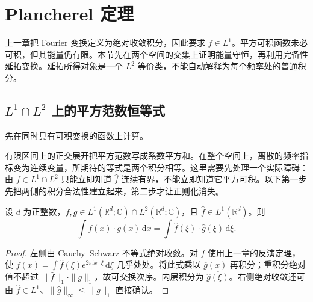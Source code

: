 \section{Plancherel 定理}
\label{b2:sec:0401}

上一章把 Fourier 变换定义为绝对收敛积分，因此要求 \(f\in L^1\)。平方可积函数未必可积，但其能量仍有限。本节先在两个空间的交集上证明能量守恒，再利用完备性延拓变换。延拓所得对象是一个 \(L^2\) 等价类，不能自动解释为每个频率处的普通积分。

\subsection{\texorpdfstring{\(L^1\cap L^2\)}{L¹∩L²} 上的平方范数恒等式}
\label{b2:subsec:040101}

先在同时具有可积变换的函数上计算。

\ProseParagraphBreak

有限区间上的正交展开把平方范数写成系数平方和。在整个空间上，离散的频率指标变为连续变量，所期待的等式是两个积分相等。这里需要先处理一个实际障碍：由 \(f\in L^1\cap L^2\) 只能立即知道 \(\widehat f\) 连续有界，不能立即知道它平方可积。以下第一步先把两侧的积分合法性建立起来，第二步才让正则化消失。

\begin{lemma}\label{b2:lem:04-parseval-core}
设 \(d\) 为正整数，\(f,g\in L^1(\mathbb R^d;\mathbb C)\cap L^2(\mathbb R^d;\mathbb C)\)，且 \(\widehat f\in L^1(\mathbb R^d)\)。则
\[
 \int f(x)\cdot\overline{g(x)}\,\mathrm{d}x
 =\int\widehat f(\xi)\cdot\overline{\widehat g(\xi)}\,\mathrm{d}\xi.
\]
\end{lemma}
\begin{proof}
左侧由 Cauchy--Schwarz 不等式绝对收敛。对 \(f\) 使用上一章的反演定理，使 \(f(x)=\int\widehat f(\xi)e^{2\pi\mathrm{i}x\cdot\xi}\,\mathrm{d}\xi\) 几乎处处。将此式乘以 \(\overline g(x)\) 再积分；重积分绝对值不超过 \(\|\widehat f\|_1\cdot\|g\|_1\)，故可交换次序。内层积分为 \(\overline{\widehat g(\xi)}\)。右侧绝对收敛还可由 \(\widehat f\in L^1\)、\(\|\widehat g\|_\infty\leq\|g\|_1\) 直接确认。
\end{proof}

